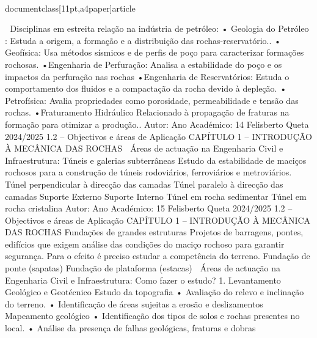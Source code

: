 \\documentclass[11pt,a4paper]{article}
\begin{document}
 Disciplinas em estreita relação na indústria de petróleo:
• Geologia do Petróleo : Estuda a origem, a formação e a distribuição das rochas-reservatório..
• Geofísica: Usa métodos sísmicos e de perfis de poço para caracterizar formações rochosas.
•Engenharia de
Perfuração:
Analisa a estabilidade do poço e os impactos da perfuração nas rochas
•Engenharia de
Reservatórios:
Estuda o comportamento dos fluidos e a compactação da rocha devido à depleção.
• Petrofísica: Avalia propriedades como porosidade, permeabilidade e tensão das rochas.
•Fraturamento Hidráulico Relacionado à propagação de fraturas na formação para otimizar a produção..
Autor:
Ano Académico:
14
Felisberto Queta
2024/2025
1.2 – Objectivos e áreas de Aplicação
CAPÍTULO 1 
–
 INTRODUÇÃO À MECÂNICA DAS ROCHAS
 Áreas de actuação na Engenharia Civil e 
Infraestrutura:
Túneis e galerias
subterrâneas
Estudo da estabilidade de maciços rochosos para a construção de túneis rodoviários,
ferroviários e metroviários.
Túnel perpendicular à direcção das 
camadas
Túnel paralelo à direcção das 
camadas
Suporte Externo Suporte Interno
Túnel em rocha 
sedimentar
Túnel em rocha 
cristalina
Autor:
Ano Académico:
15
Felisberto Queta
2024/2025
1.2 – Objectivos e áreas de Aplicação
CAPÍTULO 1 
–
 INTRODUÇÃO À MECÂNICA DAS ROCHAS
Fundações de grandes estruturas
Projetos de barragens, pontes, edifícios que exigem análise
das condições do maciço rochoso para garantir segurança.
Para o efeito é preciso estudar a competência do terreno.
Fundação de ponte (sapatas) Fundação de plataforma (estacas)
 Áreas de actuação na Engenharia Civil e 
Infraestrutura:
Como fazer o estudo?
1. Levantamento Geológico e Geotécnico
Estudo da topografia
• Avaliação do relevo e inclinação do terreno.
• Identificação de áreas sujeitas a erosão e deslizamentos
Mapeamento geológico
• Identificação dos tipos de solos e rochas presentes no local.
• Análise da presença de falhas geológicas, fraturas e dobras\
\end{document}
